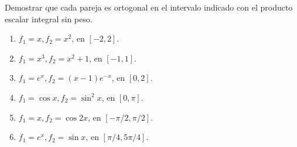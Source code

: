 Demostrar que cada pareja es ortogonal en el intervalo indicado con el producto escalar integral sin peso.

\begin{enumerate}[label=(\alph*),ref=\alph*,leftmargin=*]
\item \(f_1=x,f_2=x^2\), en \([-2,2]\).
\item \(f_1=x^3,f_2=x^2+1\), en \([-1,1]\).
\item \(f_1=e^x,f_2=(x-1)e^{-x}\), en \([0,2]\).
\item \(f_1=\cos x,f_2=\sin^2x\), en \([0,\pi]\).
\item \(f_1=x,f_2=\cos2x\), en \([-\pi/2,\pi/2]\).
\item \(f_1=e^x,f_2=\sin x\), en \([\pi/4,5\pi/4]\).
\end{enumerate}
